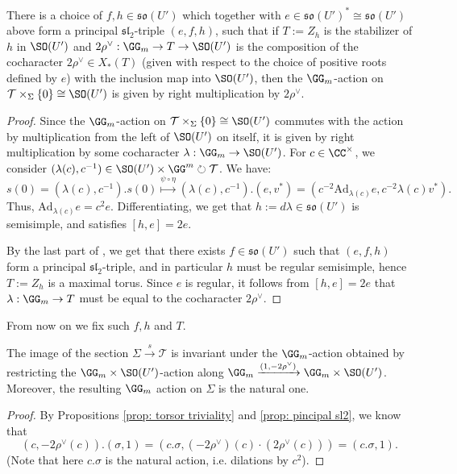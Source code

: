 \documentclass[11pt]{article}
\begin{document}
\begin{proposition}\label{prop: pincipal sl2}
    There is a choice of $f,h\in\mathfrak{so}(U')$ which together with $e\in \mathfrak{so}(U')^*\cong \mathfrak{so}(U')$ above form a principal $\mathfrak{sl}_2$-triple $(e,f,h)$, such that if $T:=Z_h$ is the stabilizer of $h$ in $\SO(U')$ and $2\rho^\vee:\GG_m\to T\to \SO(U')$ is the composition of the cocharacter $2\rho^\vee\in X_*(T)$ (given with respect to the choice of positive roots defined by $e$) with the inclusion map into $\SO(U')$, then the $\GG_m$-action on $\mathcal{T}\times_{\Sigma}\{0\}\cong \SO(U')$ is given by right multiplication by $2\rho^\vee$.
\end{proposition}
\begin{proof}
    Since the $\GG_m$-action on $\mathcal{T}\times_{\Sigma}\{0\}\cong \SO(U')$ commutes with the action by multiplication from the left of $\SO(U')$ on itself, it is given by right multiplication by some cocharacter $\lambda:\GG_m\to \SO(U')$.
    For $c\in \CC^\times$, we consider $(\lambda(c), c^{-1})\in \SO(U')\times \GG^m\circlearrowright \mathcal{T}$. We have:
    $$s(0) = (\lambda(c), c^{-1}).s(0)\stackrel{\psi\circ\eta}{\longmapsto} (\lambda(c), c^{-1}).(e, v^*) = (c^{-2} \mathrm{Ad}_{\lambda(c)}e, c^{-2} \lambda(c)v^*).$$
    Thus, $\mathrm{Ad}_{\lambda(c)}e = c^2 e$.
    Differentiating, we get that $h:=d\lambda\in \mathfrak{so}(U')$ is semisimple, and satisfies $[h,e]=2e$.
    
    By the last part of \cite[Theorem 3.6]{Kos}, we get that there exists $f\in \mathfrak{so}(U')$ such that $(e,f,h)$ form a principal $\mathfrak{sl}_2$-triple, and in particular $h$ must be regular semisimple, hence $T:=Z_h$ is a maximal torus.
    Since $e$ is regular, it follows from $[h,e]=2e$ that $\lambda:\GG_m\to T$ must be equal to the cocharacter $2\rho^\vee$.
\end{proof}
From now on we fix such $f,h$ and $T$.
\begin{proposition}\label{prop: Gm equivariance of section}
    The image of the section $\Sigma\xrightarrow{s} \mathcal{T}$ is invariant under the $\GG_m$-action obtained by restricting the $\GG_m\times \SO(U')$-action along $\GG_m\xrightarrow{(1, -2\rho^\vee)}\GG_m\times \SO(U')$. Moreover, the resulting $\GG_m$ action on $\Sigma$ is the natural one.
\end{proposition}
\begin{proof}
    By Propositions \ref{prop: torsor triviality} and \ref{prop: pincipal sl2}, we know that
    $$(c, -2\rho^\vee(c)).(\sigma, 1) = (c.\sigma, (-2\rho^\vee)(c)\cdot (2\rho^\vee(c))) = (c.\sigma, 1).$$
    (Note that here $c.\sigma$ is the natural action, i.e. dilations by $c^2$).
\end{proof}
\end{document}
